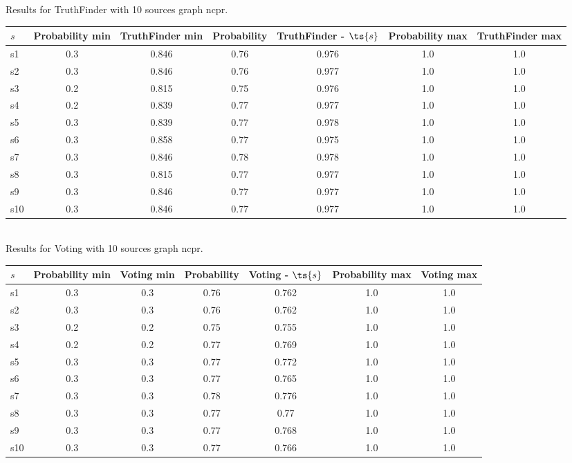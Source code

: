 \documentclass{article}
\begin{document}
\noindent Results for TruthFinder with 10 sources graph ncpr.

\noindent\begin{tabular}{|l|c|c|c|c|c|c|}
\hline
$s$& Probability min & TruthFinder min & Probability & TruthFinder - $\ts{s}$ & Probability max & TruthFinder max\\
\hline
s1 &0.3 & 0.846 & 0.76 & 0.976 & 1.0 & 1.0\\
\hline
s2 &0.3 & 0.846 & 0.76 & 0.977 & 1.0 & 1.0\\
\hline
s3 &0.2 & 0.815 & 0.75 & 0.976 & 1.0 & 1.0\\
\hline
s4 &0.2 & 0.839 & 0.77 & 0.977 & 1.0 & 1.0\\
\hline
s5 &0.3 & 0.839 & 0.77 & 0.978 & 1.0 & 1.0\\
\hline
s6 &0.3 & 0.858 & 0.77 & 0.975 & 1.0 & 1.0\\
\hline
s7 &0.3 & 0.846 & 0.78 & 0.978 & 1.0 & 1.0\\
\hline
s8 &0.3 & 0.815 & 0.77 & 0.977 & 1.0 & 1.0\\
\hline
s9 &0.3 & 0.846 & 0.77 & 0.977 & 1.0 & 1.0\\
\hline
s10 &0.3 & 0.846 & 0.77 & 0.977 & 1.0 & 1.0\\
\hline
\end{tabular}\\

\noindent Results for Voting with 10 sources graph ncpr.

\noindent\begin{tabular}{|l|c|c|c|c|c|c|}
\hline
$s$& Probability min & Voting min & Probability & Voting - $\ts{s}$ & Probability max & Voting max\\
\hline
s1 &0.3 & 0.3 & 0.76 & 0.762 & 1.0 & 1.0\\
\hline
s2 &0.3 & 0.3 & 0.76 & 0.762 & 1.0 & 1.0\\
\hline
s3 &0.2 & 0.2 & 0.75 & 0.755 & 1.0 & 1.0\\
\hline
s4 &0.2 & 0.2 & 0.77 & 0.769 & 1.0 & 1.0\\
\hline
s5 &0.3 & 0.3 & 0.77 & 0.772 & 1.0 & 1.0\\
\hline
s6 &0.3 & 0.3 & 0.77 & 0.765 & 1.0 & 1.0\\
\hline
s7 &0.3 & 0.3 & 0.78 & 0.776 & 1.0 & 1.0\\
\hline
s8 &0.3 & 0.3 & 0.77 & 0.77 & 1.0 & 1.0\\
\hline
s9 &0.3 & 0.3 & 0.77 & 0.768 & 1.0 & 1.0\\
\hline
s10 &0.3 & 0.3 & 0.77 & 0.766 & 1.0 & 1.0\\
\hline
\end{tabular}\\
\end{document}
